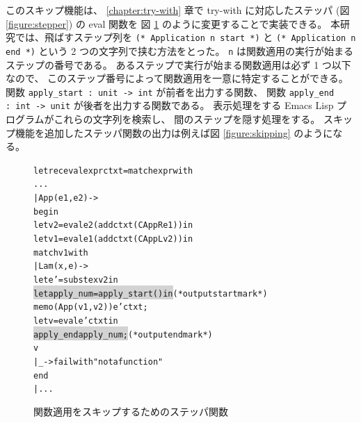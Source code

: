 このスキップ機能は、
\ref{chapter:try-with} 章で try-with に対応したステッパ
(図 \ref{figure:stepper}) の eval 関数を
図 \ref{figure:skipapp} のように変更することで実装できる。
本研究では、飛ばすステップ列を
\texttt{(* Application n start *)} と \texttt{(* Application n end *)}
という 2 つの文字列で挟む方法をとった。
\texttt{n} は関数適用の実行が始まるステップの番号である。
あるステップで実行が始まる関数適用は必ず 1 つ以下なので、
このステップ番号によって関数適用を一意に特定することができる。
関数 \texttt{apply\_start :\ unit -> int} が前者を出力する関数、
関数 \texttt{apply\_end :\ int -> unit} が後者を出力する関数である。
表示処理をする Emacs Lisp プログラムがこれらの文字列を検索し、
間のステップを隠す処理をする。
スキップ機能を追加したステッパ関数の出力は例えば図 \ref{figure:skipping} のようになる。

\begin{figure}
\begin{alltt}
let rec eval expr ctxt = match expr with
    ...
  | App (e1, e2) ->
    begin
      let v2 = eval e2 (add ctxt (CAppR e1)) in
      let v1 = eval e1 (add ctxt (CAppL v2)) in
      match v1 with
      | Lam (x, e) ->
        let e' = subst e x v2 in
        \colorbox{lightgray}{let apply_num = apply_start () in}                (* output start mark *)
        memo (App (v1, v2)) e' ctxt;
        let v = eval e' ctxt in
        \colorbox{lightgray}{apply_end apply_num;}                               (* output end mark *)
        v
      | _ -> failwith "not a function"
    end
  | ...
\end{alltt}
\caption{関数適用をスキップするためのステッパ関数}
\label{figure:skipapp}
\end{figure}

